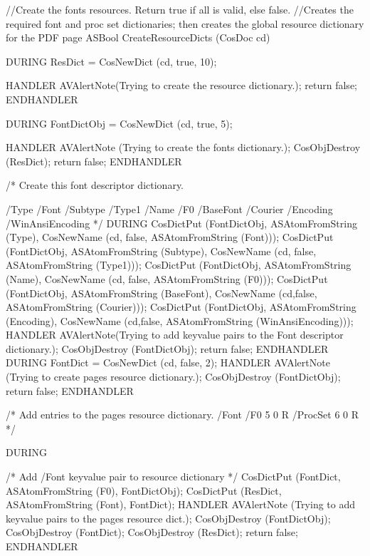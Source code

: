 \documentclass[letterpaper,12pt,english,openany,oneside]{sphinxmanual}
\begin{document}
\begin{sphinxVerbatim}[commandchars=\\\{\}]
//Create the font\PYGZsq{}s resources. Return true if all is valid, else false.
//Creates the required font and proc set dictionaries; then creates the global resource dictionary for the PDF page
ASBool CreateResourceDicts (CosDoc cd)

\PYGZob{}
DURING
  ResDict = CosNewDict (cd, true, 10);

HANDLER
  AVAlertNote(\PYGZdq{}Trying to create the resource dictionary.\PYGZdq{});
  return false;
  END\PYGZus{}HANDLER

DURING
  FontDictObj = CosNewDict (cd, true, 5);

HANDLER
  AVAlertNote (\PYGZdq{}Trying to create the font\PYGZsq{}s dictionary.\PYGZdq{});
  CosObjDestroy (ResDict);
  return false;
END\PYGZus{}HANDLER


/* Create this font descriptor dictionary.

   \PYGZlt{}\PYGZlt{}
   /Type /Font
   /Subtype /Type1
   /Name /F0
   /BaseFont /Courier
   /Encoding /WinAnsiEncoding
   \PYGZgt{}\PYGZgt{}
*/
DURING
  CosDictPut (FontDictObj, ASAtomFromString (\PYGZdq{}Type\PYGZdq{}),
  CosNewName (cd, false, ASAtomFromString (\PYGZdq{}Font\PYGZdq{})));
  CosDictPut (FontDictObj, ASAtomFromString (\PYGZdq{}Subtype\PYGZdq{}),
  CosNewName (cd, false, ASAtomFromString (\PYGZdq{}Type1\PYGZdq{})));
  CosDictPut (FontDictObj, ASAtomFromString (\PYGZdq{}Name\PYGZdq{}),
  CosNewName (cd, false, ASAtomFromString (\PYGZdq{}F0\PYGZdq{})));
  CosDictPut (FontDictObj, ASAtomFromString (\PYGZdq{}BaseFont\PYGZdq{}),
  CosNewName (cd,false, ASAtomFromString (\PYGZdq{}Courier\PYGZdq{})));
  CosDictPut (FontDictObj, ASAtomFromString (\PYGZdq{}Encoding\PYGZdq{}),
  CosNewName (cd,false, ASAtomFromString (\PYGZdq{}WinAnsiEncoding\PYGZdq{})));
HANDLER
  AVAlertNote(\PYGZdq{}Trying to add key\PYGZhy{}value pairs to the Font descriptor dictionary.\PYGZdq{});
  CosObjDestroy (FontDictObj);
  return false;
END\PYGZus{}HANDLER
DURING
  FontDict = CosNewDict (cd, false, 2);
HANDLER
  AVAlertNote (\PYGZdq{}Trying to create page\PYGZsq{}s resource dictionary.\PYGZdq{});
  CosObjDestroy (FontDictObj);
return false;
END\PYGZus{}HANDLER

   /* Add entries to the page\PYGZsq{}s resource dictionary.
      \PYGZlt{}\PYGZlt{}
      /Font \PYGZlt{}\PYGZlt{} /F0 5 0 R \PYGZgt{}\PYGZgt{}
      /ProcSet 6 0 R
      \PYGZgt{}\PYGZgt{}
   */

DURING

   /* Add /Font key\PYGZhy{}value pair to resource dictionary */
      CosDictPut (FontDict, ASAtomFromString (\PYGZdq{}F0\PYGZdq{}), FontDictObj);
      CosDictPut (ResDict, ASAtomFromString (\PYGZdq{}Font\PYGZdq{}), FontDict);
      HANDLER
      AVAlertNote  (\PYGZdq{}Trying to add key\PYGZhy{}value pairs to the page\PYGZsq{}s resource dict.\PYGZdq{});
      CosObjDestroy (FontDictObj);
      CosObjDestroy (FontDict);
      CosObjDestroy (ResDict);
      return false;
      END\PYGZus{}HANDLER


\end{sphinxVerbatim}
\end{document}

